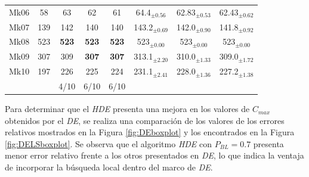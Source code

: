 \begin{table}[!tb]
\begin{tabular}{|rrcccrrc|}
    \multicolumn{1}{|c|}{Mk06} & \multicolumn{1}{c|}{58} & \multicolumn{1}{c|}{63} & \multicolumn{1}{c|}{62} & \multicolumn{1}{c|}{61} & \multicolumn{1}{c|}{64.4$_{\pm 0.56}$} & \multicolumn{1}{c|}{62.83$_{\pm 0.53}$} & 62.43$_{\pm 0.62}$ \bigstrut\\
    \multicolumn{1}{|c|}{Mk07} & \multicolumn{1}{c|}{139} & \multicolumn{1}{c|}{142} & \multicolumn{1}{c|}{140} & \multicolumn{1}{c|}{140} & \multicolumn{1}{c|}{143.2$_{\pm 0.69}$} & \multicolumn{1}{c|}{142.0$_{\pm 0.90}$} & 141.8$_{\pm 0.92}$ \bigstrut\\
    \multicolumn{1}{|c|}{Mk08} & \multicolumn{1}{c|}{523} & \multicolumn{1}{c|}{\textbf{523}} & \multicolumn{1}{c|}{\textbf{523}} & \multicolumn{1}{c|}{\textbf{523}} & \multicolumn{1}{c|}{523$_{\pm 0.00}$} & \multicolumn{1}{c|}{523$_{\pm 0.00}$} & 523$_{\pm 0.00}$ \bigstrut\\
    \multicolumn{1}{|c|}{Mk09} & \multicolumn{1}{c|}{307} & \multicolumn{1}{c|}{309} & \multicolumn{1}{c|}{\textbf{307}} & \multicolumn{1}{c|}{\textbf{307}} & \multicolumn{1}{c|}{313.1$_{\pm 2.20}$} & \multicolumn{1}{c|}{310.0$_{\pm 1.33}$} & 309.0$_{\pm 1.72}$ \bigstrut\\
    \multicolumn{1}{|c|}{Mk10} & \multicolumn{1}{c|}{197} & \multicolumn{1}{c|}{226} & \multicolumn{1}{c|}{225} & \multicolumn{1}{c|}{224} & \multicolumn{1}{c|}{231.1$_{\pm 2.41}$} & \multicolumn{1}{c|}{228.0$_{\pm 1.36}$} & 227.2$_{\pm 1.38}$ \bigstrut\\
    \hline
          &       & 4/10  & 6/10  & 6/10  &       &       &  \bigstrut\\
    \hline
    \end{tabular}%
    \label{tab:tableDELS}
\end{table}%


Para determinar que el \textit{HDE} presenta una mejora en los valores de $C_{max}$ obtenidos por el \textit{DE}, se realiza una comparación de los valores de los errores relativos mostrados en la Figura \ref{fig:DEboxplot} y los encontrados en la Figura \ref{fig:DELSboxplot}. Se observa que el algoritmo \textit{HDE} con $P_{BL} = 0.7$ presenta menor error relativo frente a los otros presentados en \textit{DE}, lo que indica la ventaja de incorporar la búsqueda local dentro del marco de \textit{DE}.


